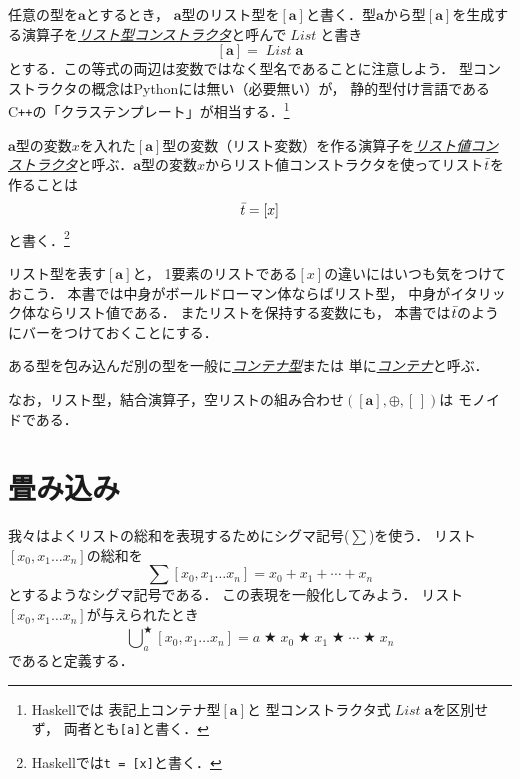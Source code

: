 \documentclass[a5paper,draft]{jsbook}
\newcommand{\programminglanguage}[1]{\textsf{#1}}
\newcommand{\cxx}{\programminglanguage{C}\texttt{++}}
\newcommand{\haskell}{\programminglanguage{Haskell}}
\newcommand{\python}{\programminglanguage{Python}}
\newcommand{\keyword}[1]{{\underline{\emph{#1}}}}
\newcommand{\code}[1]{\texttt{#1}}
\newcommand{\mathTypeParameter}[1]{\mathbf{#1}}
\newcommand{\mathTypeConstructor}[1]{\mathit{#1}} %
\newcommand{\mathListVar}[1]{\Bar{#1}}
\newcommand{\mathListType}[1]{\left[#1\right]}
\DeclareMathOperator{\mathList}{\mathTypeConstructor{List}}
\newcommand{\mathEmptyList}{{[\,]}}
\DeclareMathOperator*{\mathFold}{\bigcup}
\newcommand{\mathAnyBinaryOperator}{\mathbin{\bigstar}}
\newcommand{\mathAppend}{\oplus}
\newcommand{\mathMonoid}[3]{(#1,#2,#3)}
\begin{document}
任意の型を$\mathTypeParameter{a}$とするとき，
$\mathTypeParameter{a}$型のリスト型を$\mathListType{\mathTypeParameter{a}}$と書く．型$\mathTypeParameter{a}$から型$\mathListType{\mathTypeParameter{a}}$を生成する演算子を\keyword{リスト型コンストラクタ}と呼んで$\mathList$と書き
\begin{equation}
\mathListType{\mathTypeParameter{a}}=\mathList\mathTypeParameter{a}
\end{equation}
とする．この等式の両辺は変数ではなく型名であることに注意しよう．
型コンストラクタの概念は\python には無い（必要無い）が，
静的型付け言語である\cxx の「クラステンプレート」が相当する．\footnote{\haskell では
表記上コンテナ型$\mathListType{\mathTypeParameter{a}}$と
型コンストラクタ式$\mathList\mathTypeParameter{a}$を区別せず，
両者とも\code{[a]}と書く．}

$\mathTypeParameter{a}$型の変数$x$を入れた$\mathListType{\mathTypeParameter{a}}$型の変数（リスト変数）を作る演算子を\keyword{リスト値コンストラクタ}と呼ぶ．$\mathTypeParameter{a}$型の変数$x$からリスト値コンストラクタを使ってリスト$\mathListVar{t}$を作ることは
\begin{equation}
\mathListVar{t}=[x]
\end{equation}
と書く．\footnote{\haskell では\code{t = [x]}と書く．}

リスト型を表す$\mathListType{\mathTypeParameter{a}}$と，
1要素のリストである$[x]$の違いにはいつも気をつけておこう．
本書では中身がボールドローマン体ならばリスト型，
中身がイタリック体ならリスト値である．
またリストを保持する変数にも，
本書では$\mathListVar{t}$のようにバーをつけておくことにする．

ある型を包み込んだ別の型を一般に\keyword{コンテナ型}または
単に\keyword{コンテナ}と呼ぶ．

なお，リスト型，結合演算子，空リストの組み合わせ$\mathMonoid{\mathListType{\mathTypeParameter{a}}}{\mathAppend}{\mathEmptyList}$は
モノイドである．

\section{畳み込み}

我々はよくリストの総和を表現するためにシグマ記号($\sum$)を使う．
リスト$[x_0,x_1\dots x_n]$の総和を
\begin{equation}
\sum[x_0,x_1\dots x_n]=x_0+x_1+\dotsb+x_n
\end{equation}
とするようなシグマ記号である．
この表現を一般化してみよう．
リスト$[x_0,x_1\dots x_n]$が与えられたとき
\begin{equation}
\mathFold^{\mathAnyBinaryOperator}_{a}[x_0,x_1\dots x_n]=a\mathAnyBinaryOperator x_0\mathAnyBinaryOperator x_1\mathAnyBinaryOperator\dotsb\mathAnyBinaryOperator x_n
\end{equation}
であると定義する．
\end{document}
